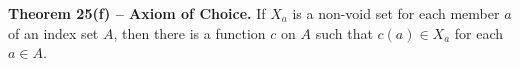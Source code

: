 \textbf{Theorem 25(f) -- Axiom of Choice.} If $X_a$ is a non-void set for each member $a$ of an index set $A$, then there is a function $c$ on $A$ such that $c(a) \in X_a$ for each $a \in A$.
